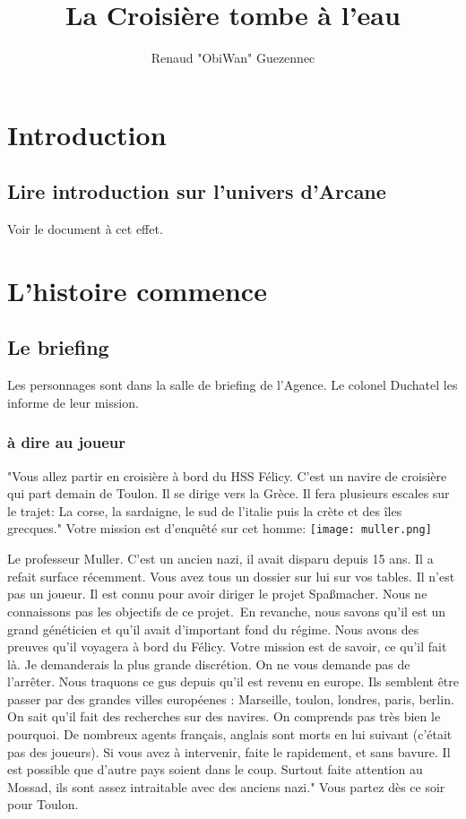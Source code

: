 \documentclass[oneside,12pt]{book}
\title{La Croisière tombe à l'eau}
\author{Renaud "ObiWan" Guezennec}
\date{}
\begin{document}
\maketitle \clearpage
\tableofcontents \clearpage

\begin{flushleft}
    \chapter{Introduction}
        \section{Lire introduction sur l'univers d'Arcane}
       Voir le document à cet effet. 
         
\chapter{L'histoire commence}
\section{Le briefing}
Les personnages sont dans la salle de briefing de l'Agence.
Le colonel Duchatel les informe de leur mission.
\subsection{à dire au joueur}
"Vous allez partir en croisière à bord du HSS Félicy. C'est un navire de croisière qui part demain de Toulon. Il se dirige vers la Grèce. Il fera plusieurs escales sur le trajet: 
La corse, la sardaigne, le sud de l'italie puis la crète et des îles grecques."
Votre mission est d'enquêté sur cet homme: \texttt{[image: muller.png]}

Le professeur Muller.
C'est un ancien nazi, il avait disparu depuis 15 ans. Il a refait surface récemment. Vous avez tous un dossier sur lui sur vos tables. Il n'est pas un joueur.
Il est connu pour avoir diriger le projet Spaßmacher. Nous ne connaissons pas les objectifs de ce projet. En revanche, nous savons qu'il est un grand généticien et qu'il avait d'important fond du régime.
Nous avons des preuves qu'il voyagera à bord du Félicy. Votre mission est de savoir, ce qu'il fait là. Je demanderais la plus grande discrétion. On ne vous demande pas de l'arrêter. 
Nous traquons ce gus depuis qu'il est revenu en europe. Ils semblent être passer par des grandes villes européenes : Marseille, toulon, londres, paris, berlin. On sait qu'il fait des recherches sur des navires. On comprends pas très bien le pourquoi. De nombreux agents français, anglais sont morts en lui suivant (c'était pas des joueurs).  
Si vous avez à intervenir, faite le rapidement, et sans bavure. Il est possible que d'autre pays soient dans le coup. Surtout faite attention au Mossad, ils sont assez intraitable avec des anciens nazi."
Vous partez dès ce soir pour Toulon. 


\end{flushleft}
\end{document}
